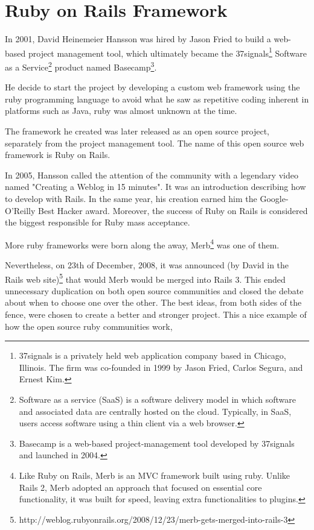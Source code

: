\section{Ruby on Rails Framework} 
In 2001, David Heinemeier Hansson was hired by Jason Fried to build a web-based project management tool, 
which ultimately became the 
\textsf{37signals}\footnote{
  37signals is a privately held web application company based in Chicago, Illinois. 
  The firm was co-founded in 1999 by Jason Fried, Carlos Segura, and Ernest Kim.
}
\textsf{Software as a Service}\footnote{
 Software as a service (SaaS) is a software delivery model in which software and associated data are centrally hosted on the cloud.
 Typically, in SaaS, users access software using a thin client via a web browser.
}  
product named 
\textsf{Basecamp}\footnote{
  Basecamp is a web-based project-management tool developed by 37signals and launched in 2004.
}.

He decide to start the project by developing a custom web framework using the ruby programming language
to avoid what he saw as repetitive coding inherent in platforms such as Java,
ruby was almost unknown at the time.

The framework he created was later released as an open source project, separately from the project management tool. 
The name of this open source web framework is Ruby on Rails.

In 2005, Hansson called the attention of the community with a legendary video named "Creating a Weblog in 15 minutes". 
It was an introduction describing how to develop with Rails.
In the same year, his creation earned him the Google-O'Reilly Best Hacker award.
Moreover, the success of Ruby on Rails is considered the biggest responsible for Ruby mass acceptance.

More ruby frameworks were born along the away, 
\textsf{Merb}\footnote{
 Like Ruby on Rails, Merb is an MVC framework built using ruby.
 Unlike Rails 2, Merb adopted an approach that focused on essential core functionality, 
 it was built for speed, leaving extra functionalities to plugins.
}
was one of them.

Nevertheless, on 23th of December, 2008, it was announced
\textsf{(by David in the Rails web site)}\footnote{
 http://weblog.rubyonrails.org/2008/12/23/merb-gets-merged-into-rails-3
}
that
would Merb would be merged into Rails 3.
This ended unnecessary duplication on both open source communities 
and closed the debate about when to choose one over the other.
The best ideas, from both sides of the fence, were chosen to create a better and stronger project.
This a nice example of how the open source ruby communities work, 

